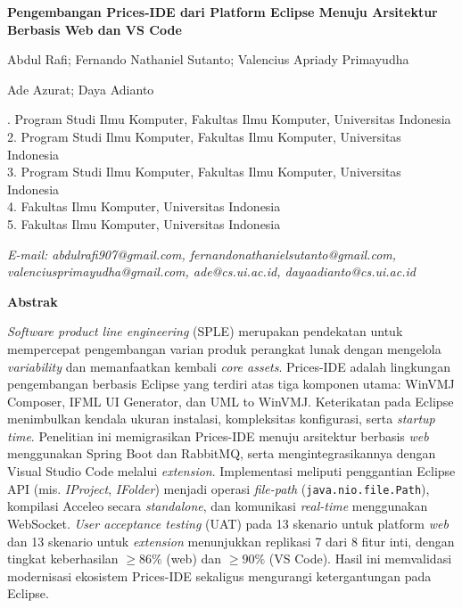 \documentclass[12pt,a4paper,onecolumn]{article}
\makeatletter
\newcommand{\f}[1]{\textit{#1}}
\def\judul{Pengembangan Prices-IDE dari Platform Eclipse Menuju Arsitektur Berbasis Web dan VS Code}
\def\penulisMahasiswa{Abdul Rafi; Fernando Nathaniel Sutanto; Valencius Apriady Primayudha}
\def\penulisPembimbing{Ade Azurat; Daya Adianto}
\def\afiliasiSatu{Program Studi Ilmu Komputer, Fakultas Ilmu Komputer, Universitas Indonesia}
\def\afiliasiDua{Program Studi Ilmu Komputer, Fakultas Ilmu Komputer, Universitas Indonesia}
\def\afiliasiTiga{Program Studi Ilmu Komputer, Fakultas Ilmu Komputer, Universitas Indonesia}
\def\afiliasiEmpat{Fakultas Ilmu Komputer, Universitas Indonesia}
\def\afiliasiLima{Fakultas Ilmu Komputer, Universitas Indonesia}
\def\emailSatu{abdulrafi907@gmail.com, fernandonathanielsutanto@gmail.com, valenciusprimayudha@gmail.com, ade@cs.ui.ac.id, dayaadianto@cs.ui.ac.id}
\renewcommand\maketitle{%
  \begin{center}
    {\fontsize{14}{17}\selectfont\bfseries \judul\par\vspace{12pt}}
    {\normalsize \penulisMahasiswa\par}
    {\normalsize \penulisPembimbing\par\vspace{12pt}}
    {\fontsize{10}{12}\selectfont
      1. \afiliasiSatu\\
      2. \afiliasiDua\\
      3. \afiliasiTiga\\
      4. \afiliasiEmpat\\
      5. \afiliasiLima\par}
    \vspace{12pt}
    {\fontsize{10}{12}\selectfont\itshape E-mail: \emailSatu\par}
  \end{center}
}
\makeatother
\begin{document}
\maketitle

\vspace*{1\baselineskip}
{\begin{center}\textbf{\fontsize{12}{14}\selectfont Abstrak}\end{center}}
\vspace{12pt}
{\fontsize{10}{12}\selectfont
\singlespacing
\f{Software product line engineering} (SPLE) merupakan pendekatan untuk mempercepat pengembangan varian produk perangkat lunak dengan mengelola \f{variability} dan memanfaatkan kembali \f{core assets}. Prices-IDE adalah lingkungan pengembangan berbasis Eclipse yang terdiri atas tiga komponen utama: WinVMJ Composer, IFML UI Generator, dan UML to WinVMJ. Keterikatan pada Eclipse menimbulkan kendala ukuran instalasi, kompleksitas konfigurasi, serta \f{startup time}. Penelitian ini memigrasikan Prices-IDE menuju arsitektur berbasis \f{web} menggunakan Spring Boot dan RabbitMQ, serta mengintegrasikannya dengan Visual Studio Code melalui \f{extension}. Implementasi meliputi penggantian Eclipse API (mis. \f{IProject}, \f{IFolder}) menjadi operasi \f{file-path} (\texttt{java.nio.file.Path}), kompilasi Acceleo secara \f{standalone}, dan komunikasi \f{real-time} menggunakan WebSocket. \f{User acceptance testing} (UAT) pada 13 skenario untuk platform \f{web} dan 13 skenario untuk \f{extension} menunjukkan replikasi 7 dari 8 fitur inti, dengan tingkat keberhasilan $\geq86\%$ (web) dan $\geq90\%$ (VS Code). Hasil ini memvalidasi modernisasi ekosistem Prices-IDE sekaligus mengurangi ketergantungan pada Eclipse.\par}
\end{document}
